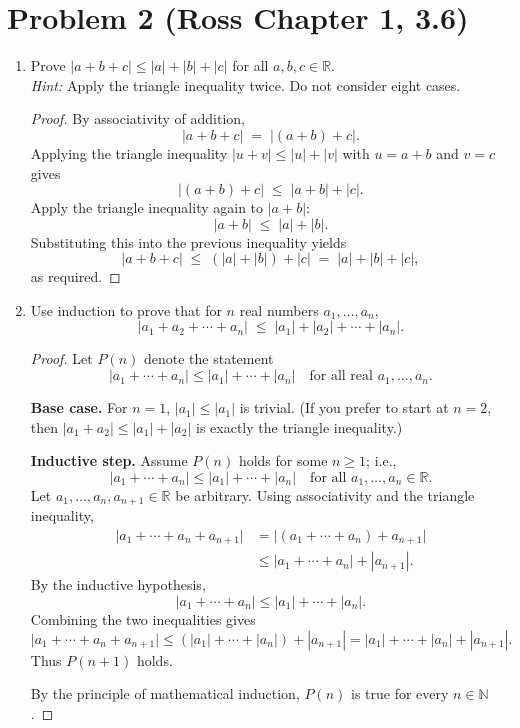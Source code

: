 \documentclass[12pt]{article}
\begin{document}
\section*{Problem 2 (Ross Chapter 1, 3.6)}
\begin{enumerate}[label=\alph*.]

\item Prove $|a+b+c| \le |a|+|b|+|c|$ for all $a,b,c\in\mathbb{R}$. \\
\textit{Hint:} Apply the triangle inequality twice. Do not consider eight cases.

\begin{proof}
By associativity of addition,
\[
|a+b+c| \;=\; |(a+b)+c|.
\]
Applying the triangle inequality $|u+v|\le |u|+|v|$ with $u=a+b$ and $v=c$ gives
\[
|(a+b)+c| \;\le\; |a+b|+|c|.
\]
Apply the triangle inequality again to $|a+b|$:
\[
|a+b| \;\le\; |a|+|b|.
\]
Substituting this into the previous inequality yields
\[
|a+b+c| \;\le\; (|a|+|b|)+|c| \;=\; |a|+|b|+|c|,
\]
as required.
\end{proof}

\item Use induction to prove that for $n$ real numbers $a_1,\dots,a_n$,
\[
\bigl|a_1+a_2+\cdots+a_n\bigr| \;\le\; |a_1|+|a_2|+\cdots+|a_n|.
\]

\begin{proof}
Let $P(n)$ denote the statement
\[
\bigl|a_1+\cdots+a_n\bigr| \le |a_1|+\cdots+|a_n|
\quad\text{for all real }a_1,\dots,a_n.
\]

\textbf{Base case.}
For $n=1$, $|a_1| \le |a_1|$ is trivial.  
(If you prefer to start at $n=2$, then $|a_1+a_2|\le |a_1|+|a_2|$ is exactly the triangle inequality.)

\textbf{Inductive step.}
Assume $P(n)$ holds for some $n\ge 1$; i.e.,
\[
\bigl|a_1+\cdots+a_n\bigr| \le |a_1|+\cdots+|a_n|
\quad\text{for all }a_1,\dots,a_n\in\mathbb{R}.
\]
Let $a_1,\dots,a_n,a_{n+1}\in\mathbb{R}$ be arbitrary. Using associativity and the triangle inequality,
\begin{align*}
\bigl|a_1+\cdots+a_n+a_{n+1}\bigr|
&= \bigl|(a_1+\cdots+a_n)+a_{n+1}\bigr| \\
&\le \bigl|a_1+\cdots+a_n\bigr| + |a_{n+1}|.
\end{align*}
By the inductive hypothesis,
\[
\bigl|a_1+\cdots+a_n\bigr| \le |a_1|+\cdots+|a_n|.
\]
Combining the two inequalities gives
\[
\bigl|a_1+\cdots+a_n+a_{n+1}\bigr|
\le (|a_1|+\cdots+|a_n|)+|a_{n+1}|
= |a_1|+\cdots+|a_n|+|a_{n+1}|.
\]
Thus $P(n+1)$ holds.

By the principle of mathematical induction, $P(n)$ is true for every $n\in\mathbb{N}$.
\end{proof}

\end{enumerate}
\end{document}
